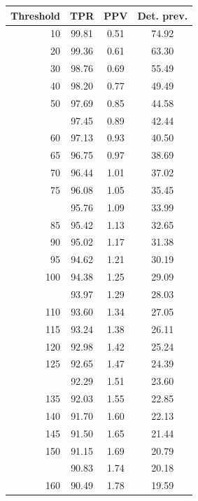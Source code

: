 \documentclass[12pt]{article}
\begin{document}
\begin{minipage}{0.5\textwidth}\small
\begin{tabular}{rccc}
\toprule
\textbf{Threshold} & \textbf{TPR} 
& \textbf{PPV} & \textbf{Det. prev.} \\
\midrule
 10 & 99.81 & 0.51 & 74.92 \\ 
   20 & 99.36 & 0.61 & 63.30 \\ 
   30 & 98.76 & 0.69 & 55.49 \\ 
   40 & 98.20 & 0.77 & 49.49 \\ 
   50 & 97.69 & 0.85 & 44.58 \\ \addlinespace
   55 & 97.45 & 0.89 & 42.44 \\ 
   60 & 97.13 & 0.93 & 40.50 \\ 
   65 & 96.75 & 0.97 & 38.69 \\ 
   70 & 96.44 & 1.01 & 37.02 \\ 
   75 & 96.08 & 1.05 & 35.45 \\  \addlinespace
   80 & 95.76 & 1.09 & 33.99 \\ 
   85 & 95.42 & 1.13 & 32.65 \\ 
   90 & 95.02 & 1.17 & 31.38 \\ 
   95 & 94.62 & 1.21 & 30.19 \\ 
  100 & 94.38 & 1.25 & 29.09 \\  \addlinespace
  105 & 93.97 & 1.29 & 28.03 \\ 
  110 & 93.60 & 1.34 & 27.05 \\ 
  115 & 93.24 & 1.38 & 26.11 \\ 
  120 & 92.98 & 1.42 & 25.24 \\ 
  125 & 92.65 & 1.47 & 24.39 \\  \addlinespace
  130 & 92.29 & 1.51 & 23.60 \\ 
  135 & 92.03 & 1.55 & 22.85 \\ 
  140 & 91.70 & 1.60 & 22.13 \\ 
  145 & 91.50 & 1.65 & 21.44 \\ 
  150 & 91.15 & 1.69 & 20.79 \\  \addlinespace
  155 & 90.83 & 1.74 & 20.18 \\ 
  160 & 90.49 & 1.78 & 19.59 \\ 
     
\bottomrule
\end{tabular}

\end{minipage} \hfill
\end{document}
